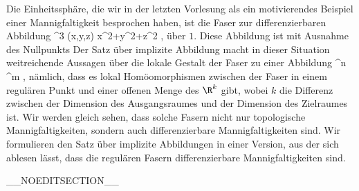 \setcounter{section}{8}


Die Einheitssphäre, die wir in der letzten Vorlesung als ein motivierendes Beispiel einer Mannigfaltigkeit besprochen haben, ist die Faser zur differenzierbaren Abbildung
\maabbeledisp {} { \R^3 } { \R
} { (x,y,z) } { x^2+y^2+z^2
} {,}
über $1$. Diese Abbildung ist mit Ausnahme des Nullpunkts
Der Satz über implizite Abbildung macht in dieser Situation weitreichende Aussagen über die lokale Gestalt der Faser zu einer Abbildung
\maabb {\varphi} {\R^n} { \R^m
} {,}
nämlich, dass es lokal Homöomorphismen zwischen der Faser in einem regulären Punkt und einer offenen Menge des $\R^k$ gibt, wobei $k$ die Differenz zwischen der Dimension des Ausgangsraumes und der Dimension des Zielraumes ist. Wir werden gleich sehen, dass solche Fasern nicht nur topologische Mannigfaltigkeiten, sondern auch differenzierbare Mannigfaltigkeiten sind. Wir formulieren den Satz über implizite Abbildungen in einer Version, aus der sich ablesen lässt, dass die regulären Fasern differenzierbare Mannigfaltigkeiten sind.

__NOEDITSECTION__

